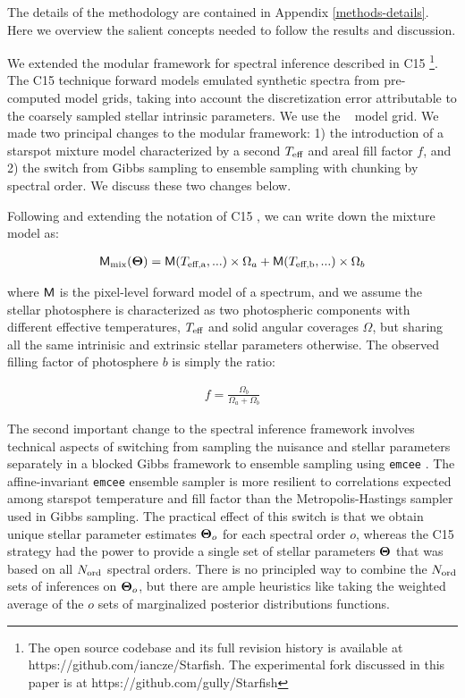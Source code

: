 \documentclass[onecolumn]{emulateapj}%
\newcommand{\iancze}{{\sc C15 }}
\begin{document}
The details of the methodology are contained in Appendix \ref{methods-details}.  Here we overview the salient concepts needed to follow the results and discussion.

We extended the modular framework for spectral inference described in \iancze \footnote{The open source codebase and its full revision history is available at https://github.com/iancze/Starfish.  The experimental fork discussed in this paper is at https://github.com/gully/Starfish}.  The \iancze technique forward models emulated synthetic spectra from pre-computed model grids, taking into account the discretization error attributable to the coarsely sampled stellar intrinsic parameters.  We use the \PHOENIX~ model grid. We made two principal changes to the modular framework: 1) the introduction of a starspot mixture model characterized by a second $T_\textrm{eff}$ and areal fill factor $f$, and 2) the switch from Gibbs sampling to ensemble sampling with chunking by spectral order.  We discuss these two changes below.

Following and extending the notation of \iancze, we can write down the mixture model as:

\begin{eqnarray} \label{eqn:mix_M}
\mathsf{M}_{\mathrm{mix}}({\bm \Theta}) = \mathsf{M}(T_\textrm{eff,a}, ...) \times \Omega_a + \mathsf{M}(T_\textrm{eff,b}, ...) \times \Omega_b
\end{eqnarray}

where $\mathsf{M}$ is the pixel-level forward model of a spectrum, and we assume the stellar photosphere is characterized as two photospheric components with different effective temperatures, $T_\textrm{eff}$ and solid angular coverages $\Omega$, but sharing all the same intrinisic and extrinsic stellar parameters otherwise.  The observed filling factor of photosphere $b$ is simply the ratio:

\begin{eqnarray} \label{eqn:mix_M}
f = \frac{\Omega_b}{\Omega_a + \Omega_b}
\end{eqnarray}

The second important change to the spectral inference framework involves technical aspects of switching from sampling the nuisance and stellar parameters separately in a blocked Gibbs framework to ensemble sampling using \texttt{emcee} \cite{2013PASP..125..306F}.  The affine-invariant \texttt{emcee} ensemble sampler is more resilient to correlations expected among starspot temperature and fill factor than the Metropolis-Hastings sampler used in Gibbs sampling.  The practical effect of this switch is that we obtain unique stellar parameter estimates ${\bm \Theta}_{o}$ for each spectral order $o$, whereas the \iancze strategy had the power to provide a single set of stellar parameters ${\bm \Theta}$ that was based on all $N_{\rm ord}$ spectral orders.  There is no principled way to combine the $N_{\rm ord}$ sets of inferences on ${\bm \Theta}_{o}$, but there are ample heuristics like taking the weighted average of the $o$ sets of marginalized posterior distributions functions.
\end{document}
